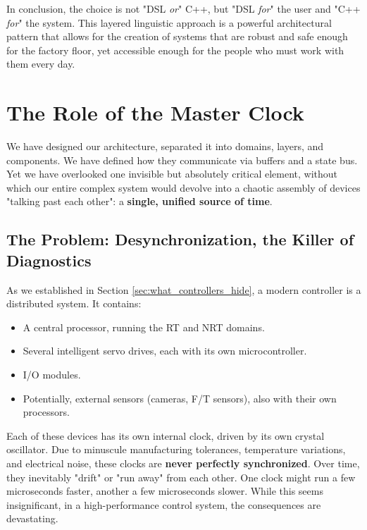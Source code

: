 In conclusion, the choice is not "DSL \textit{or}" C++, but "DSL \textit{for}" the user and "C++ \textit{for}" the system. This layered linguistic approach is a powerful architectural pattern that allows for the creation of systems that are robust and safe enough for the factory floor, yet accessible enough for the people who must work with them every day.





\section{The Role of the Master Clock}
\label{sec:master_clock}

We have designed our architecture, separated it into domains, layers, and components. We have defined how they communicate via buffers and a state bus. Yet we have overlooked one invisible but absolutely critical element, without which our entire complex system would devolve into a chaotic assembly of devices "talking past each other": a \textbf{single, unified source of time}.

\subsection{The Problem: Desynchronization, the Killer of Diagnostics}
\label{subsec:desync_problem}

As we established in Section \ref{sec:what_controllers_hide}, a modern controller is a distributed system. It contains:
\begin{itemize}
    \item A central processor, running the RT and NRT domains.
    \item Several intelligent servo drives, each with its own microcontroller.
    \item I/O modules.
    \item Potentially, external sensors (cameras, F/T sensors), also with their own processors.
\end{itemize}

Each of these devices has its own internal clock, driven by its own crystal oscillator. Due to minuscule manufacturing tolerances, temperature variations, and electrical noise, these clocks are \textbf{never perfectly synchronized}. Over time, they inevitably "drift" or "run away" from each other. One clock might run a few microseconds faster, another a few microseconds slower. While this seems insignificant, in a high-performance control system, the consequences are devastating.

